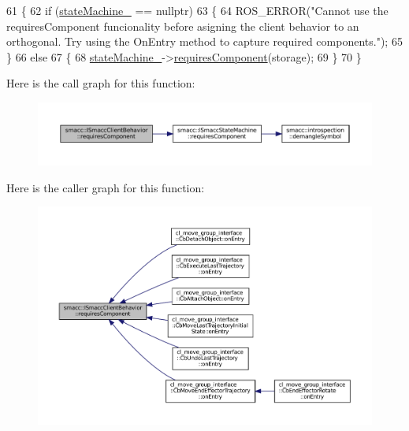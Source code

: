 \begin{DoxyCode}
61 \{
62     \textcolor{keywordflow}{if} (\hyperlink{classsmacc_1_1ISmaccClientBehavior_a0fea65db292a8bb3dfba3e5840491d79}{stateMachine\_} == \textcolor{keyword}{nullptr})
63     \{
64         ROS\_ERROR(\textcolor{stringliteral}{"Cannot use the requiresComponent funcionality before asigning the client behavior to an
       orthogonal. Try using the OnEntry method to capture required components."});
65     \}
66     \textcolor{keywordflow}{else}
67     \{
68         \hyperlink{classsmacc_1_1ISmaccClientBehavior_a0fea65db292a8bb3dfba3e5840491d79}{stateMachine\_}->\hyperlink{classsmacc_1_1ISmaccStateMachine_aa6b25e28f3bce24c4b356dc865a9eb7b}{requiresComponent}(storage);
69     \}
70 \}
\end{DoxyCode}
Here is the call graph for this function\+:
\nopagebreak
\begin{figure}[H]
\begin{center}
\leavevmode
\includegraphics[width=350pt]{classsmacc_1_1ISmaccClientBehavior_a19c6d658c8e809bb93bfdc9b639a3ac3_cgraph}
\end{center}
\end{figure}
Here is the caller graph for this function\+:
\nopagebreak
\begin{figure}[H]
\begin{center}
\leavevmode
\includegraphics[width=350pt]{classsmacc_1_1ISmaccClientBehavior_a19c6d658c8e809bb93bfdc9b639a3ac3_icgraph}
\end{center}
\end{figure}
\mbox{\label{classsmacc_1_1ISmaccClientBehavior_a1078de57f291301cc2829c3548fa5ea5}} 
